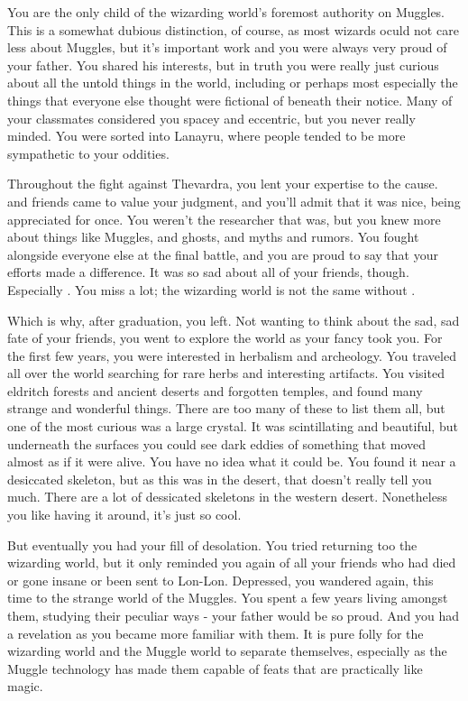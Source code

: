 \documentclass[char]{Katmeers}
\begin{document}
\name{\cLuna{}}


You are the only child of the wizarding world's foremost authority on Muggles. This is a somewhat dubious distinction, of course, as most wizards oculd not care less about Muggles, but it's important work and you were always very proud of your father. You shared his interests, but in truth you were really just curious about all the untold things in the world, including or perhaps most especially the things that everyone else thought were fictional of beneath their notice. Many of your classmates considered you spacey and eccentric, but you never really minded. You were sorted into Lanayru, where people tended to be more sympathetic to your oddities.

Throughout the fight against Thevardra, you lent your expertise to the cause. \cHarry{} and \cHarry{\their} friends came to value your judgment, and you'll admit that it was nice, being appreciated for once. You weren't the researcher that \cHermione{} was, but you knew more about things like Muggles, and ghosts, and myths and rumors. You fought alongside everyone else at the final battle, and you are proud to say that your efforts made a difference. It was so sad about all of your friends, though. Especially \cHarry{}. You miss \cHarry{} a lot; the wizarding world is not the same without \cHarry{\them}.

Which is why, after graduation, you left. Not wanting to think about the sad, sad fate of your friends, you went to explore the world as your fancy took you. For the first few years, you were interested in herbalism and archeology. You traveled all over the world searching for rare herbs and interesting artifacts. You visited eldritch forests and ancient deserts and forgotten temples, and found many strange and wonderful things. There are too many of these to list them all, but one of the most curious was a large crystal. It was scintillating and beautiful, but underneath the surfaces you could see dark eddies of something that moved almost as if it were alive. You have no idea what it could be. You found it near a desiccated skeleton, but as this was in the desert, that doesn't really tell you much. There are a lot of dessicated skeletons in the western desert. Nonetheless you like having it around, it's just so cool.

But eventually you had your fill of desolation. You tried returning too the wizarding world, but it only reminded you again of all your friends who had died or gone insane or been sent to Lon-Lon. Depressed, you wandered again, this time to the strange world of the Muggles. You spent a few years living amongst them, studying their peculiar ways - your father would be so proud. And you had a revelation as you became more familiar with them. It is pure folly for the wizarding world and the Muggle world to separate themselves, especially as the Muggle technology has made them capable of feats that are practically like magic.
\end{document}
